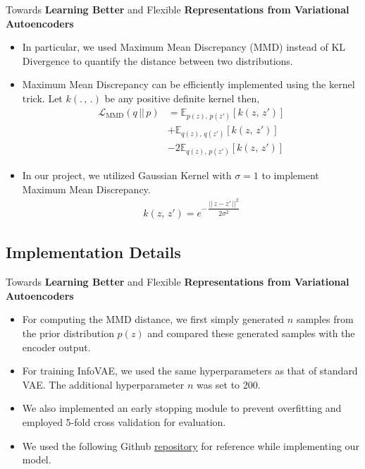 \documentclass[hyperref={colorlinks,citecolor=blue,linkcolor=blue,urlcolor=blue}]{beamer}
\begin{document}
\begin{frame}{ Towards \textbf{Learning Better} and Flexible \textbf{Representations from Variational Autoencoders} \vspace{0.3em}}
  \begin{itemize}
    \item In particular, we used Maximum Mean Discrepancy (MMD) instead of KL Divergence to quantify the distance between two distributions.
    \item Maximum Mean Discrepancy can be efficiently implemented using the kernel trick. Let $k(.\,,\,.)$ be any positive definite kernel then,
    \begin{align*}
      \mathcal{L}_{\text{MMD}}(q \,||\, p) &= \mathbb{E}_{p(z),\,p(z')}[k(z,\,z')] \\
                                           &+ \mathbb{E}_{q(z),\,q(z')}[k(z,\,z')] \\ 
                                           &- 2\mathbb{E}_{q(z),\,p(z')}[k(z,\,z')]
    \end{align*}
    \item In our project, we utilized Gaussian Kernel with $\sigma=1$ to implement Maximum Mean Discrepancy.
    \begin{align*}
      k(z,\,z') = e^{-\,\dfrac{||\,z-z'\,||^2}{2\sigma^2}}
    \end{align*}
  \end{itemize}
\end{frame}

\subsection{Implementation Details}

\begin{frame}{ Towards \textbf{Learning Better} and Flexible \textbf{Representations from Variational Autoencoders} \vspace{0.3em}}
  \begin{itemize}
    \item For computing the MMD distance, we first simply generated $n$ samples from the prior distribution $p(z)$ and compared these generated samples with the encoder output.
    \item For training InfoVAE, we used the same hyperparameters as that of standard VAE. The additional hyperparameter $n$ was set to 200.
    \item We also implemented an early stopping module to prevent overfitting and employed 5-fold cross validation for evaluation.
    \item We used the following Github \href{https://github.com/napsternxg/pytorch-practice}{repository} for reference while implementing our model.
  \end{itemize}
\end{frame}
\end{document}
